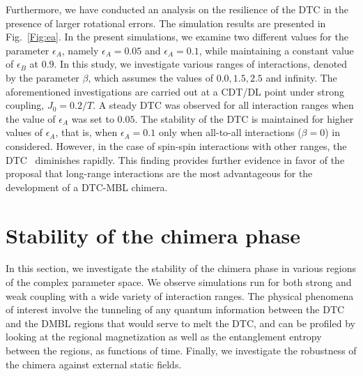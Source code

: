 \documentclass[12pt]{iopart}
\begin{document}
Furthermore, we have conducted an analysis on the resilience of the DTC in the presence of larger rotational errors. The simulation results are presented in Fig.~\ref{Fig:ea}. In the present simulations, we examine two different values for the parameter $\epsilon_A$, namely $\epsilon_A = 0.05$ and $\epsilon_A = 0.1$, while maintaining a constant value of $\epsilon_B$ at $0.9$. In this study, we investigate various ranges of interactions, denoted by the parameter $\beta$, which assumes the values of $0.0, 1.5, 2.5$ and infinity. The aforementioned investigations are carried out at a CDT/DL point under strong coupling, $J_0 = 0.2/T$.  A steady DTC was observed for all interaction ranges when the value of $\epsilon_A$ was set to $0.05$. The stability of the DTC is maintained for higher values of $\epsilon_A$, that is, when $\epsilon_A = 0.1$ only when all-to-all interactions ($\beta=0$) in considered. However, in the case of spin-spin interactions with other ranges, the DTC  diminishes rapidly. This finding provides further evidence in favor of the proposal that long-range interactions are the most advantageous for the development of a DTC-MBL chimera.

\section{\label{sec:level4} Stability of the chimera phase}
In this section, we investigate the stability of the chimera phase in various regions of the complex parameter space. We observe simulations run for both strong and weak coupling with a wide variety of interaction ranges. The physical phenomena of interest involve the tunneling of any quantum information between the DTC and the DMBL regions that would serve to melt the DTC, and can be profiled by looking at the regional magnetization as well as the entanglement entropy between the regions, as functions of time. Finally, we investigate the robustness of the chimera against external static fields.
\end{document}
